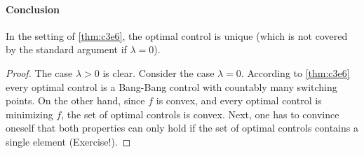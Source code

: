 \documentclass[../skript.tex]{subfiles}
\begin{document}
\paragraph{Conclusion}
In the setting of \cref{thm:c3e6}, the optimal control is unique (which is not covered by the standard argument if $\lambda = 0$).
\begin{proof}
The case $\lambda > 0$ is clear. Consider the case $\lambda = 0$. According to \cref{thm:c3e6} every optimal control is a Bang-Bang control with countably many switching points. 
On the other hand, since $f$ is convex, and every optimal control is minimizing $f$, the set of optimal controls is convex.
Next, one has to convince oneself that both properties can only hold if the set of optimal controls contains a single element (Exercise!).
\end{proof} 
\end{document}
